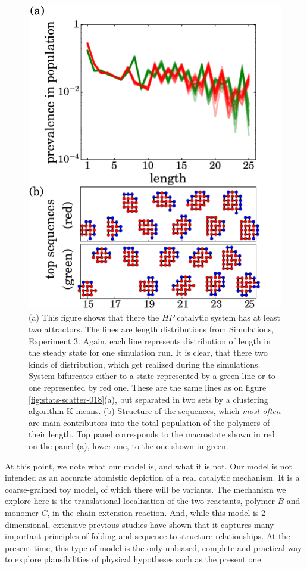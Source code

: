 \documentclass[5p,times]{elsarticle}
\begin{document}
\begin{figure}[h!]
  \centering
  \includegraphics[width=0.9\columnwidth]{pictures/distr1837-dynamics.pdf}
  \caption{\footnotesize{\textbf{} (a) This figure shows that there the $HP$ catalytic system has 
at least two attractors. The lines are length distributions from Simulations, Experiment 3. Again, 
each line represents distribution of length in the steady state for one simulation run. It is 
clear, that there two kinds of distribution, which get realized during the simulations. System 
bifurcates either to a state represented by a green line or to one represented by red one. These 
are the same lines as on figure \ref{fig:stats-scatter-018}(a), but separated in two sets by a 
clustering algorithm K-means. (b) Structure of the sequences, which \textit{most often} 
are main contributors into the total population of the polymers of their length. Top panel 
corresponds to the macrostate shown in red on the panel (a), lower one, to the one shown in green. 
}}
  \label{fig:distr1837-dyn}
\end{figure}


At this point, we note what our model is, and what it is not.  Our model is not intended as an 
 accurate atomistic depiction of a real catalytic mechanism.  It is a coarse-grained toy model, of 
which there will be variants.  The mechanism we explore here is the translational localization of 
the two reactants, polymer $B$ and monomer $C$, in the chain extension reaction.  And, while this 
model is 2-dimensional, extensive previous studies have shown that it captures many important 
principles of folding and sequence-to-structure relationships.  At the present time, this type of 
model is the only unbiased, complete and practical way to explore plausibilities of physical 
hypotheses such as the present one.
\end{document}
